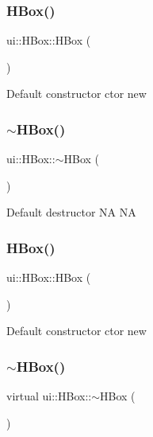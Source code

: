 \subsubsection{\texorpdfstring{H\+Box()}{HBox()}\hspace{0.1cm}{\footnotesize\ttfamily [1/2]}}
{\footnotesize\ttfamily ui\+::\+H\+Box\+::\+H\+Box (\begin{DoxyParamCaption}{ }\end{DoxyParamCaption})}

Default constructor  ctor  new \mbox{\label{classui_1_1HBox_aee3cccf328de7ca6cb2e9841e7223cd9}} 
\subsubsection{\texorpdfstring{$\sim$\+H\+Box()}{~HBox()}\hspace{0.1cm}{\footnotesize\ttfamily [1/2]}}
{\footnotesize\ttfamily ui\+::\+H\+Box\+::$\sim$\+H\+Box (\begin{DoxyParamCaption}{ }\end{DoxyParamCaption})\hspace{0.3cm}{\ttfamily [virtual]}}

Default destructor  NA  NA \mbox{\label{classui_1_1HBox_a019d6f16534667d80294fd30306009c6}} 
\subsubsection{\texorpdfstring{H\+Box()}{HBox()}\hspace{0.1cm}{\footnotesize\ttfamily [2/2]}}
{\footnotesize\ttfamily ui\+::\+H\+Box\+::\+H\+Box (\begin{DoxyParamCaption}{ }\end{DoxyParamCaption})}

Default constructor  ctor  new \mbox{\label{classui_1_1HBox_a71eed7fec1971098b2ea6ac76d25bbfa}} 
\subsubsection{\texorpdfstring{$\sim$\+H\+Box()}{~HBox()}\hspace{0.1cm}{\footnotesize\ttfamily [2/2]}}
{\footnotesize\ttfamily virtual ui\+::\+H\+Box\+::$\sim$\+H\+Box (\begin{DoxyParamCaption}{ }\end{DoxyParamCaption})\hspace{0.3cm}{\ttfamily [virtual]}}

